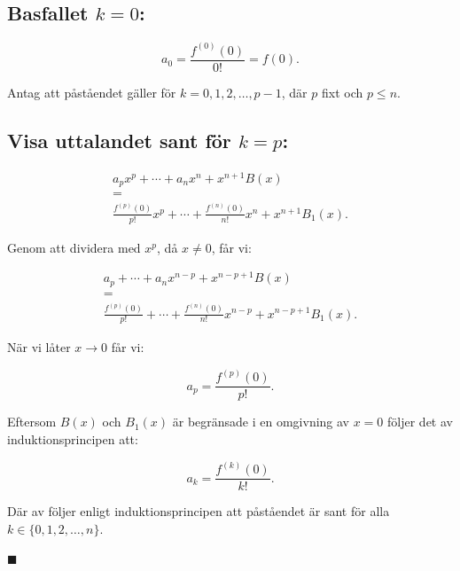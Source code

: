 \documentclass{article}
\begin{document}
\subsection*{Basfallet $k=0$:}

\begin{equation}
    a_0 = \frac{f^{(0)}(0)}{0!} = f(0).
\end{equation}

\noindent Antag att påståendet gäller för
$k=0,1,2,\ldots,p-1$, där $p$ fixt och $p\leq n$.

\subsection*{Visa uttalandet sant för $k=p$:}

\begin{equation}
\begin{gathered}
    a_px^p + \cdots + a_nx^n + x^{n+1}B(x)\\
    =\\
    \frac{f^{(p)}(0)}{p!}x^p
    + \cdots
    + \frac{f^{(n)}(0)}{n!}x^n
    + x^{n+1}B_1(x).
\end{gathered}
\end{equation}

\noindent Genom att dividera med $x^p$, då $x\neq 0$, får vi:

\begin{equation}
\begin{gathered}
    a_p + \cdots + a_nx^{n-p}
    + x^{n-p+1}B(x)\\
    =\\
    \frac{f^{(p)}(0)}{p!}
    + \cdots
    + \frac{f^{(n)}(0)}{n!}x^{n-p}
    + x^{n-p+1}B_1(x).
\end{gathered}
\end{equation}

\noindent När vi låter $x\longrightarrow 0$ får vi:

\begin{equation}
    a_p = \frac{f^{(p)}(0)}{p!}.
\end{equation}

\noindent Eftersom $B(x)$ och $B_1(x)$ är begränsade i en
omgivning av $x=0$ följer det av induktionsprincipen att:

\begin{equation}
    a_k = \frac{f^{(k)}(0)}{k!}.
\end{equation}

\noindent Där av följer enligt induktionsprincipen att
påståendet är sant för alla
$k \in \{0,1,2,\ldots,n\}$.
\begin{flushright}
    $\blacksquare$
\end{flushright}
\end{document}
